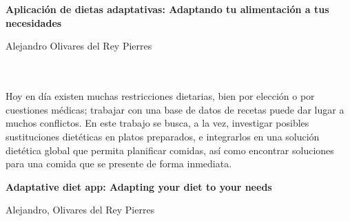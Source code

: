 \chapter*{}


\cleardoublepage
\thispagestyle{empty}

\begin{center}
{\large\bfseries Aplicación de dietas adaptativas: Adaptando tu alimentación a tus necesidades}\\
\end{center}
\begin{center}
Alejandro Olivares del Rey Pierres\\
\end{center}

\\

\vspace{0.7cm}
\\

Hoy en día existen muchas restricciones dietarias, bien por elección o por cuestiones médicas; trabajar con una base de datos de recetas
puede dar lugar a muchos conflictos. En este trabajo se busca, a la vez, investigar posibles sustituciones dietéticas en platos preparados, e
integrarlos en una solución dietética global que permita planificar comidas, así como encontrar soluciones para una comida que se presente
de forma inmediata.
\cleardoublepage


\thispagestyle{empty}


\begin{center}
{\large\bfseries Adaptative diet app: Adapting your diet to your needs}\\
\end{center}
\begin{center}
Alejandro, Olivares del Rey Pierres \\
\end{center}

\\

\vspace{0.7cm}
\\

